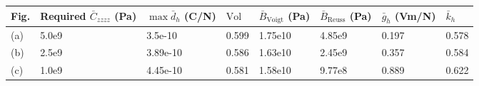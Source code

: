 \begin{tabular}{l|lllllll}
Fig. & Required $\bar{C}_{zzzz}$ (Pa) & $\max\bar{d}_h$ (C/N) & $\mathrm{Vol}$ & $\bar{B}_\mathrm{Voigt}$ (Pa) & $\bar{B}_\mathrm{Reuss}$ (Pa) & $\bar{g}_h$ (Vm/N) & $\bar{k}_h$ \\
\hline 
(a) & 5.0e9 & 3.5e-10 & 0.599 & 1.75e10 & 4.85e9 & 0.197 & 0.578 \\
\hline 
(b) & 2.5e9 & 3.89e-10 & 0.586 & 1.63e10 & 2.45e9 & 0.357 & 0.584 \\
\hline 
(c) & 1.0e9 & 4.45e-10 & 0.581 & 1.58e10 & 9.77e8 & 0.889 & 0.622 \\
\hline 
\end{tabular}
